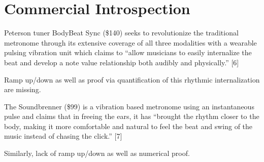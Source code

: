 \section{Commercial Introspection}
Peterson tuner BodyBeat Sync (\$140) seeks to revolutionize the traditional metronome through its extensive coverage of all three modalities with a wearable pulsing vibration unit which claims to “allow musicians to easily internalize the beat and develop a note value relationship both audibly and physically.” [6]

Ramp up/down as well as proof via quantification of this rhythmic internalization are missing.

The Soundbrenner (\$99) is a vibration based metronome using an instantaneous pulse and claims that in freeing the ears, it has “brought the rhythm closer to the body, making it more comfortable and natural to feel the beat and swing of the music instead of chasing the click.” [7]

Similarly, lack of ramp up/down as well as numerical proof.
